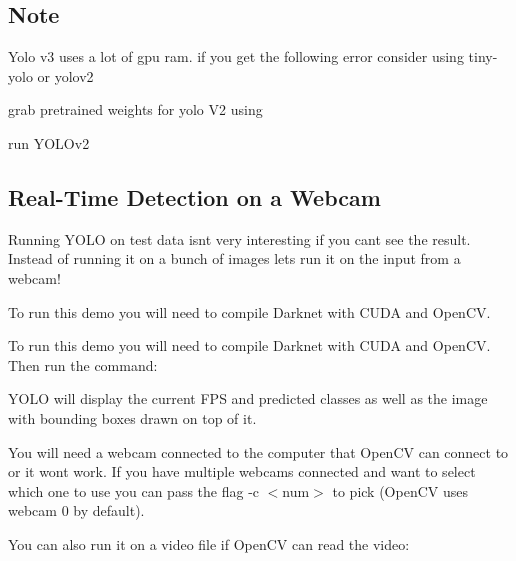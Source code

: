  \subsection*{Note}

Yolo v3 uses a lot of gpu ram. if you get the following error consider using tiny-\/yolo or yolov2

grab pretrained weights for yolo V2 using 
\begin{DoxyCode}{0}
\end{DoxyCode}


run Y\+O\+L\+Ov2


\begin{DoxyCode}{0}
\end{DoxyCode}
 \subsection*{Real-\/\+Time Detection on a Webcam}

Running Y\+O\+LO on test data isn\textquotesingle{}t very interesting if you can\textquotesingle{}t see the result. Instead of running it on a bunch of images let\textquotesingle{}s run it on the input from a webcam!

To run this demo you will need to compile Darknet with C\+U\+DA and Open\+CV.

To run this demo you will need to compile Darknet with C\+U\+DA and Open\+CV. Then run the command\+: 
\begin{DoxyCode}{0}
\end{DoxyCode}
 Y\+O\+LO will display the current F\+PS and predicted classes as well as the image with bounding boxes drawn on top of it.

You will need a webcam connected to the computer that Open\+CV can connect to or it won\textquotesingle{}t work. If you have multiple webcams connected and want to select which one to use you can pass the flag -\/c $<$num$>$ to pick (Open\+CV uses webcam 0 by default).

You can also run it on a video file if Open\+CV can read the video\+: 
\begin{DoxyCode}{0}
\end{DoxyCode}


